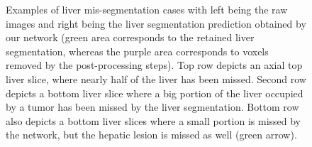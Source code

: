\begin{figure}[ht!]
\begin{minipage}{0.45\linewidth}
	\end{minipage}
	\caption{Examples of liver mis-segmentation cases with left being the raw images and right being the liver segmentation prediction obtained by our  network (green area corresponds to the retained liver segmentation, whereas the purple area corresponds to voxels removed by the post-processing steps). Top row depicts an axial top liver slice, where nearly half of the liver has been missed. Second row depicts a bottom liver slice where a big portion of the liver occupied by a tumor has been missed by the liver segmentation. Bottom row also depicts a bottom liver slices where a small portion is missed by the network, but the hepatic lesion is missed as well (green arrow).}
	\label{fig:LITS_networkMisSeg_extremSlices}
\end{figure}

